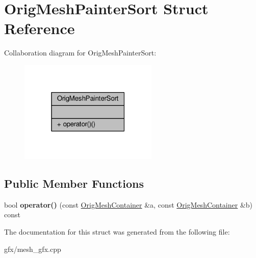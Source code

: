 \hypertarget{structOrigMeshPainterSort}{}\section{Orig\+Mesh\+Painter\+Sort Struct Reference}
\label{structOrigMeshPainterSort}


Collaboration diagram for Orig\+Mesh\+Painter\+Sort\+:
\nopagebreak
\begin{figure}[H]
\begin{center}
\leavevmode
\includegraphics[width=187pt]{d7/d38/structOrigMeshPainterSort__coll__graph}
\end{center}
\end{figure}
\subsection*{Public Member Functions}
\begin{DoxyCompactItemize}
\item 
bool {\bfseries operator()} (const \hyperlink{classOrigMeshContainer}{Orig\+Mesh\+Container} \&a, const \hyperlink{classOrigMeshContainer}{Orig\+Mesh\+Container} \&b) const \hypertarget{structOrigMeshPainterSort_a9476af2bf298ec4ba3316c8f3743b13c}{}\label{structOrigMeshPainterSort_a9476af2bf298ec4ba3316c8f3743b13c}

\end{DoxyCompactItemize}


The documentation for this struct was generated from the following file\+:\begin{DoxyCompactItemize}
\item 
gfx/mesh\+\_\+gfx.\+cpp\end{DoxyCompactItemize}
